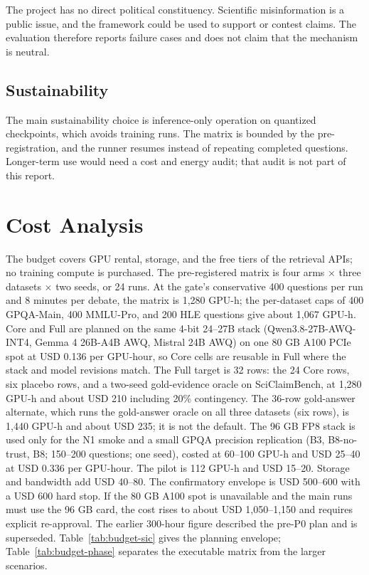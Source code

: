 The project has no direct political constituency. Scientific misinformation is a public issue, and the framework could be used to support or contest claims. The evaluation therefore reports failure cases and does not claim that the mechanism is neutral.

\subsection{Sustainability}

The main sustainability choice is inference-only operation on quantized checkpoints, which avoids training runs. The matrix is bounded by the pre-registration, and the runner resumes instead of repeating completed questions. Longer-term use would need a cost and energy audit; that audit is not part of this report.


\section{Cost Analysis}

The budget covers GPU rental, storage, and the free tiers of the retrieval APIs; no training compute is purchased. The pre-registered matrix is four arms $\times$ three datasets $\times$ two seeds, or 24 runs. At the gate's conservative 400 questions per run and 8 minutes per debate, the matrix is 1,280 GPU-h; the per-dataset caps of 400 GPQA-Main, 400 MMLU-Pro, and 200 HLE questions give about 1,067 GPU-h. Core and Full are planned on the same 4-bit 24--27B stack (Qwen3.8-27B-AWQ-INT4, Gemma 4 26B-A4B AWQ, Mistral 24B AWQ) on one 80 GB A100 PCIe spot at USD 0.136 per GPU-hour, so Core cells are reusable in Full where the stack and model revisions match. The Full target is 32 rows: the 24 Core rows, six placebo rows, and a two-seed gold-evidence oracle on SciClaimBench, at 1,280 GPU-h and about USD 210 including 20\% contingency. The 36-row gold-answer alternate, which runs the gold-answer oracle on all three datasets (six rows), is 1,440 GPU-h and about USD 235; it is not the default. The 96 GB FP8 stack is used only for the N1 smoke and a small GPQA precision replication (B3, B8-no-trust, B8; 150--200 questions; one seed), costed at 60--100 GPU-h and USD 25--40 at USD 0.336 per GPU-hour. The pilot is 112 GPU-h and USD 15--20. Storage and bandwidth add USD 40--80. The confirmatory envelope is USD 500--600 with a USD 600 hard stop. If the 80 GB A100 spot is unavailable and the main runs must use the 96 GB card, the cost rises to about USD 1,050--1,150 and requires explicit re-approval. The earlier 300-hour figure described the pre-P0 plan and is superseded. Table~\ref{tab:budget-sic} gives the planning envelope; Table~\ref{tab:budget-phase} separates the executable matrix from the larger scenarios.

